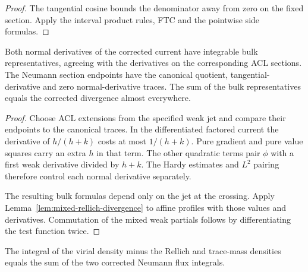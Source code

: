 \begin{proof}
\leanok
The tangential cosine bounds the denominator away from zero on the
fixed section. Apply the interval product rules, FTC and the pointwise
side formulas.
\end{proof}

\begin{lemma}
\label{lem:mixed-rellich-integrable-sections}
\leanok
Both normal derivatives of the corrected current have integrable bulk
representatives, agreeing with the derivatives on the corresponding
ACL sections. The Neumann section endpoints have the canonical
quotient, tangential-derivative and zero normal-derivative traces.
The sum of the bulk representatives equals the corrected divergence
almost everywhere.
\end{lemma}

\begin{proof}
\leanok
Choose ACL extensions from the specified weak jet and compare their
endpoints to the canonical traces. In the differentiated factored
current the derivative of $h/(h+k)$ costs at most $1/(h+k)$.
Pure gradient and pure value squares carry an extra $h$ in that term.
The other quadratic terms pair $\phi$ with a first weak derivative
divided by $h+k$. The Hardy estimates and $L^2$ pairing therefore
control each normal derivative separately.

The resulting bulk formulas depend only on the jet at the crossing.
Apply Lemma~\ref{lem:mixed-rellich-divergence} to affine profiles with
those values and derivatives. Commutation of the mixed weak partials
follows by differentiating the test function twice.
\end{proof}

\begin{lemma}
\label{lem:mixed-rellich-flux}
\leanok
The integral of the virial density minus the Rellich and trace-mass
densities equals the sum of the two corrected Neumann flux integrals.
\end{lemma}

